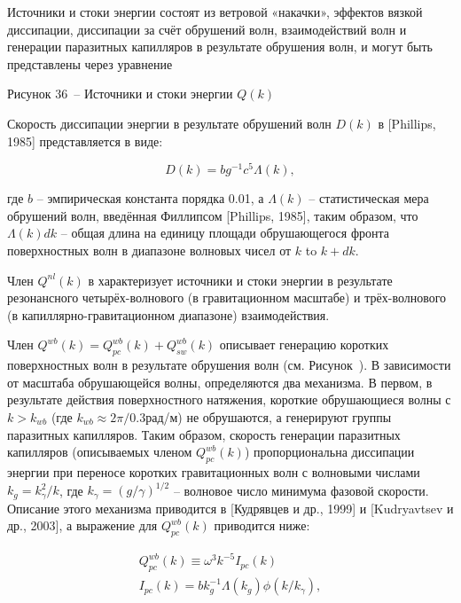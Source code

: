Источники и стоки энергии состоят из ветровой «накачки», эффектов вязкой диссипации, диссипации за счёт обрушений волн, взаимодействий волн и генерации паразитных капилляров в результате обрушения волн, и могут быть представлены через уравнение 



Рисунок 36~-- Источники и стоки энергии $Q(k)$



Скорость диссипации энергии в результате обрушений волн $D(k)$ в  [Phillips, 1985] представляется в виде:



\begin{equation} \label{1.33)} D(k)=bg^{-1} c^{5} \Lambda (k), \end{equation} 



где $b$ -- эмпирическая константа порядка 0.01, а $\Lambda (k)$ -- статистическая мера обрушений волн, введённая Филлипсом [Phillips, 1985], таким образом, что $\Lambda (k)dk$ -- общая длина на единицу площади обрушающегося фронта поверхностных волн в диапазоне волновых чисел от $k$ to $k+dk$.

Член $Q^{nl} (k)$ в  характеризует источники и стоки энергии в результате резонансного четырёх-волнового (в гравитационном масштабе) и трёх-волнового (в капиллярно-гравитационном диапазоне) взаимодействия.

Член $Q^{wb} (k)=Q_{pc}^{wb} (k)+Q_{sw}^{wb} (k)$ описывает генерацию коротких поверхностных волн в результате обрушения волн (см. Рисунок~). В зависимости от масштаба обрушающейся волны, определяются два механизма. В первом, в результате действия поверхностного натяжения, короткие обрушающиеся волны с $k>k_{wb} $ (где $k_{wb} \approx 2\pi /0.3$рад/м) не обрушаются, а генерируют группы паразитных капилляров. Таким образом, скорость генерации паразитных капилляров (описываемых членом $Q_{pc}^{wb} (k)$) пропорциональна диссипации энергии при переносе коротких гравитационных волн с волновыми числами $k_{g} =k_{\gamma }^{2} /k$, где $k_{\gamma } =(g/\gamma )^{1/2} $ -- волновое число минимума фазовой скорости. Описание этого механизма приводится в [Кудрявцев и др., 1999] и [Kudryavtsev и др., 2003], а выражение для $Q_{pc}^{wb} (k)$ приводится ниже:



\begin{equation} \label{1.34)} \begin{array}{l} {Q_{pc}^{wb} (k)\equiv \omega ^{3} k^{-5} I_{pc} (k)} \\ {I_{pc} (k)=bk_{g}^{-1} \Lambda (k_{g} )\phi (k/k_{\gamma } ),} \end{array} \end{equation} 



